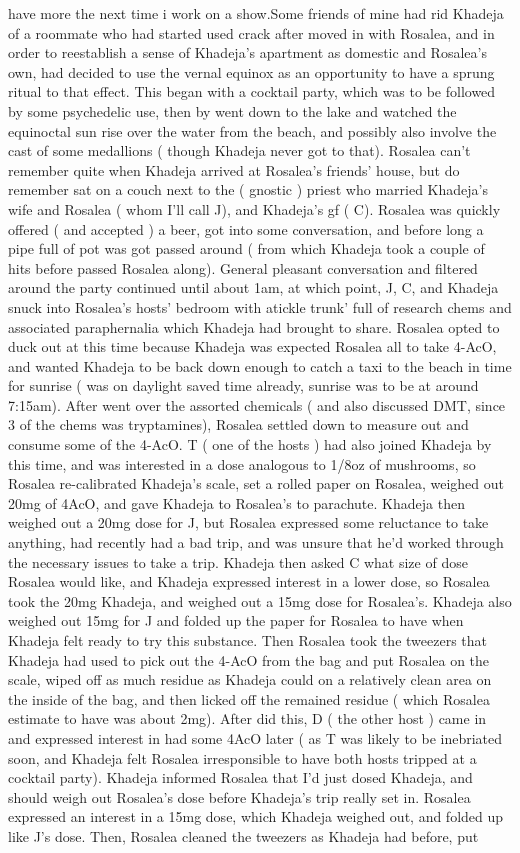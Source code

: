 \documentclass[12pt]{book}
\begin{document}
have more the next time i work on a show.Some friends of mine had rid Khadeja of a roommate who had started used crack after moved in with Rosalea, and in order to reestablish a sense of Khadeja's apartment as domestic and Rosalea's own, had decided to use the vernal equinox as an opportunity to have a sprung ritual to that effect. This began with a cocktail party, which was to be followed by some psychedelic use, then by went down to the lake and watched the equinoctal sun rise over the water from the beach, and possibly also involve the cast of some medallions ( though Khadeja never got to that). Rosalea can't remember quite when Khadeja arrived at Rosalea's friends' house, but do remember sat on a couch next to the ( gnostic ) priest who married Khadeja's wife and Rosalea ( whom I'll call J), and Khadeja's gf ( C). Rosalea was quickly offered ( and accepted ) a beer, got into some conversation, and before long a pipe full of pot was got passed around ( from which Khadeja took a couple of hits before passed Rosalea along). General pleasant conversation and filtered around the party continued until about 1am, at which point, J, C, and Khadeja snuck into Rosalea's hosts' bedroom with atickle trunk' full of research chems and associated paraphernalia which Khadeja had brought to share. Rosalea opted to duck out at this time because Khadeja was expected Rosalea all to take 4-AcO, and wanted Khadeja to be back down enough to catch a taxi to the beach in time for sunrise ( was on daylight saved time already, sunrise was to be at around 7:15am). After went over the assorted chemicals ( and also discussed DMT, since 3 of the chems was tryptamines), Rosalea settled down to measure out and consume some of the 4-AcO. T ( one of the hosts ) had also joined Khadeja by this time, and was interested in a dose analogous to 1/8oz of mushrooms, so Rosalea re-calibrated Khadeja's scale, set a rolled paper on Rosalea, weighed out 20mg of 4AcO, and gave Khadeja to Rosalea's to parachute. Khadeja then weighed out a 20mg dose for J, but Rosalea expressed some reluctance to take anything, had recently had a bad trip, and was unsure that he'd worked through the necessary issues to take a trip. Khadeja then asked C what size of dose Rosalea would like, and Khadeja expressed interest in a lower dose, so Rosalea took the 20mg Khadeja, and weighed out a 15mg dose for Rosalea's. Khadeja also weighed out 15mg for J and folded up the paper for Rosalea to have when Khadeja felt ready to try this substance. Then Rosalea took the tweezers that Khadeja had used to pick out the 4-AcO from the bag and put Rosalea on the scale, wiped off as much residue as Khadeja could on a relatively clean area on the inside of the bag, and then licked off the remained residue ( which Rosalea estimate to have was about 2mg). After did this, D ( the other host ) came in and expressed interest in had some 4AcO later ( as T was likely to be inebriated soon, and Khadeja felt Rosalea irresponsible to have both hosts tripped at a cocktail party). Khadeja informed Rosalea that I'd just dosed Khadeja, and should weigh out Rosalea's dose before Khadeja's trip really set in. Rosalea expressed an interest in a 15mg dose, which Khadeja weighed out, and folded up like J's dose. Then, Rosalea cleaned the tweezers as Khadeja had before, put 
\end{document}
